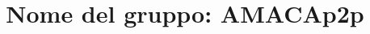 \documentclass[a4paper, 12pt]{article}
\begin{document}
\title{Nome del gruppo: AMACAp2p}


\maketitle

\newpage
\end{document}
